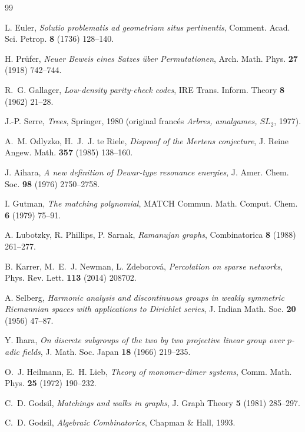 \documentclass[11pt]{article}
\begin{document}
\begin{thebibliography}{99}\small

 L. Euler,
\emph{Solutio problematis ad geometriam situs pertinentis},
Comment. Acad. Sci. Petrop. \textbf{8} (1736) 128--140.

 H. Pr\"ufer,
\emph{Neuer Beweis eines Satzes \"uber Permutationen},
Arch. Math. Phys. \textbf{27} (1918) 742--744.

 R.~G. Gallager,
\emph{Low-density parity-check codes}, IRE Trans. Inform. Theory \textbf{8} (1962) 21--28.

 J.-P. Serre,
\emph{Trees}, Springer, 1980 (original francés \emph{Arbres, amalgames, $SL_2$}, 1977).

 A.~M. Odlyzko, H.~J.~J. te Riele,
\emph{Disproof of the Mertens conjecture}, J. Reine Angew. Math. \textbf{357} (1985)
138--160.

 J. Aihara,
\emph{A new definition of Dewar-type resonance energies},
J. Amer. Chem. Soc. \textbf{98} (1976) 2750--2758.

 I. Gutman,
\emph{The matching polynomial}, MATCH Commun. Math. Comput. Chem. \textbf{6} (1979)
75--91.

 A. Lubotzky, R. Phillips, P. Sarnak,
\emph{Ramanujan graphs}, Combinatorica \textbf{8} (1988) 261--277.

 B. Karrer, M.~E.~J. Newman, L. Zdeborov\'a,
\emph{Percolation on sparse networks}, Phys. Rev. Lett. \textbf{113} (2014) 208702.

 A. Selberg,
\emph{Harmonic analysis and discontinuous groups in weakly symmetric Riemannian spaces with
applications to Dirichlet series}, J. Indian Math. Soc. \textbf{20} (1956) 47--87.

 Y. Ihara,
\emph{On discrete subgroups of the two by two projective linear group over $p$-adic fields},
J. Math. Soc. Japan \textbf{18} (1966) 219--235.

 O.~J. Heilmann, E.~H. Lieb,
\emph{Theory of monomer-dimer systems}, Comm. Math. Phys. \textbf{25} (1972) 190--232.

 C.~D. Godsil,
\emph{Matchings and walks in graphs}, J. Graph Theory \textbf{5} (1981) 285--297.

 C.~D. Godsil,
\emph{Algebraic Combinatorics}, Chapman \& Hall, 1993.


\end{thebibliography}
\end{document}
